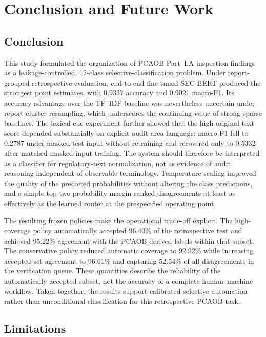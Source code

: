 \documentclass[11pt]{article}
\begin{document}
\section{Conclusion and Future Work}
\label{sec:conclusion}

\subsection{Conclusion}

This study formulated the organization of PCAOB Part~I.A inspection findings as
a leakage-controlled, 12-class selective-classification problem. Under
report-grouped retrospective evaluation, end-to-end fine-tuned SEC-BERT produced
the strongest point estimates, with 0.9337 accuracy and 0.9021 macro-F1. Its
accuracy advantage over the TF--IDF baseline was nevertheless uncertain under
report-cluster resampling, which underscores the continuing value of strong
sparse baselines. The lexical-cue experiment further showed that the high
original-text score depended substantially on explicit audit-area language:
macro-F1 fell to 0.2787 under masked test input without retraining and recovered
only to 0.5332 after matched masked-input training. The system should therefore
be interpreted as a classifier for regulatory-text normalization, not as evidence
of audit reasoning independent of observable terminology. Temperature scaling
improved the quality of the predicted probabilities without altering the class
predictions, and a simple top-two probability margin ranked disagreements at
least as effectively as the learned router at the prespecified operating point.

The resulting frozen policies make the operational trade-off explicit. The
high-coverage policy automatically accepted 96.40\% of the retrospective test
and achieved 95.22\% agreement with the PCAOB-derived labels within that subset.
The conservative policy reduced automatic coverage to 92.92\% while increasing
accepted-set agreement to 96.61\% and capturing 52.54\% of all disagreements in
the verification queue. These quantities describe the reliability of the
automatically accepted subset, not the accuracy of a complete human--machine
workflow. Taken together, the results support calibrated selective automation
rather than unconditional classification for this retrospective PCAOB task.

\subsection{Limitations}
\end{document}
